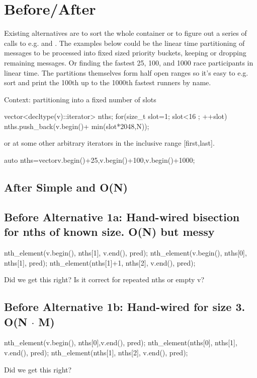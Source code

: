 \section{Before/After}

Existing alternatives are to sort the whole container or to figure out a series of calls to e.g.  and . 
The examples below could be the linear time partitioning of messages to be
processed into fixed sized priority buckets, keeping or dropping remaining messages. Or finding the fastest 25, 100, and 1000 race participants in linear time. 
The partitions themselves form half open ranges so it's easy to e.g. sort and
print the 100th up to the 1000th fastest runners by name. 

Context: partitioning into a fixed number of slots
\begin{codeblock}
vector<decltype(v)::iterator> nths;
for(size_t slot=1; slot<16 ; ++slot){
	nths.push_back(v.begin()+ min(slot*2048,N));
}
\end{codeblock}
or at some other arbitrary iterators in the inclusive range [first,last].
\begin{codeblock}
auto nths=vector{v.begin()+25,v.begin()+100,v.begin()+1000}; 
\end{codeblock}

\subsection*{After \textnormal{ Simple and O(N)}}

\hspace{2ex}
\vspace*{1ex}

\subsection*{Before \textnormal{Alternative 1a: Hand-wired bisection for nths of known size. O(N) but messy}}
\begin{codeblock}
nth_element(v.begin(), nths[1], v.end(), pred);
nth_element(v.begin(), nths[0], nths[1], pred);
nth_element(nths[1]+1, nths[2], v.end(), pred);
\end{codeblock}
Did we get this right? Is it correct for repeated nths or empty v?

\subsection*{Before \textnormal{Alternative 1b: Hand-wired for size 3. O(N $\cdot$ M)}}
\begin{codeblock}
nth_element(v.begin(), nths[0],v.end(), pred);
nth_element(nths[0], nths[1], v.end(), pred);
nth_element(nths[1], nths[2], v.end(), pred);
\end{codeblock}
Did we get this right?

